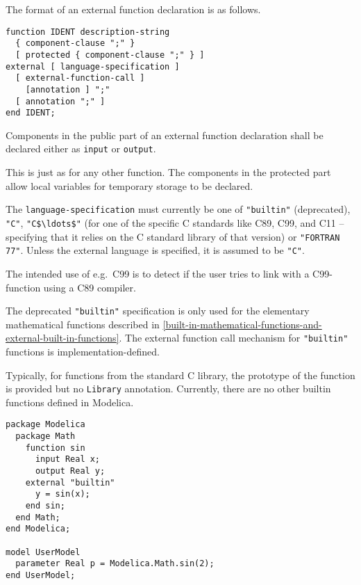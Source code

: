 The format of an external function declaration is as follows.
\begin{lstlisting}[language=grammar]
function IDENT description-string
  { component-clause ";" }
  [ protected { component-clause ";" } ]
external [ language-specification ]
  [ external-function-call ]
    [annotation ] ";"
  [ annotation ";" ]
end IDENT;
\end{lstlisting}%

Components in the public part of an external function declaration shall be declared either as \lstinline!input! or \lstinline!output!.

\begin{nonnormative}
This is just as for any other function.  The components in the protected part allow local variables for temporary storage to be declared.
\end{nonnormative}

The \lstinline[language=grammar]!language-specification! must currently be one of \lstinline!"builtin"! (deprecated), \lstinline!"C"!, \lstinline!"C$\ldots$"! (for one of the specific C standards like C89, C99, and C11 -- specifying
that it relies on the C standard library of that version) or \lstinline!"FORTRAN 77"!.
Unless the external language is specified, it is assumed to be \lstinline!"C"!.

\begin{nonnormative}
The intended use of e.g.\ C99 is to detect if the user tries to link with a C99-function using a C89 compiler.
\end{nonnormative}

The deprecated \lstinline!"builtin"! specification is only used for the elementary mathematical functions described in \cref{built-in-mathematical-functions-and-external-built-in-functions}.
The external function call mechanism for \lstinline!"builtin"! functions is implementation-defined.

\begin{nonnormative}
Typically, for functions from the standard C library, the prototype of the function is provided but no \lstinline!Library! annotation.  Currently, there are no other builtin functions defined in Modelica.
\end{nonnormative}

\begin{example}
\begin{lstlisting}[language=modelica]
package Modelica
  package Math
    function sin
      input Real x;
      output Real y;
    external "builtin"
      y = sin(x);
    end sin;
  end Math;
end Modelica;

model UserModel
  parameter Real p = Modelica.Math.sin(2);
end UserModel;
\end{lstlisting}
\end{example}

